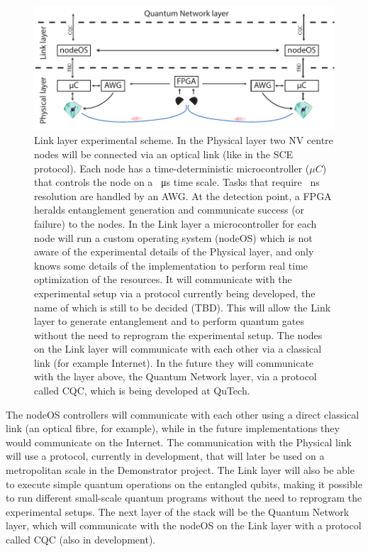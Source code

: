 \documentclass[a4paper]{article}
\begin{document}
\begin{figure}
	\includegraphics[width=\textwidth]{images/figure4}
	\caption{Link layer experimental scheme. 
		In the Physical layer two \ac{NV} centre nodes will be connected via an optical link (like in the \ac{SCE} protocol). Each node has a time-deterministic microcontroller ($\mu C$) that controls the node on a \SI{}{\micro s} time scale. Tasks that require \SI{}{\nano s} resolution are handled by an \acf{AWG}. At the detection point, a \acf{FPGA} heralds entanglement generation and communicate success (or failure) to the nodes.
		In the Link layer a microcontroller for each node will run a custom operating system (nodeOS) which is not aware of the experimental details of the Physical layer, and only knows some details of the  implementation to perform real time optimization of the resources. It will communicate with the experimental setup via a protocol currently being developed, the name of which is still to be decided (TBD). This will allow the Link layer to generate entanglement and to perform quantum gates without the need to reprogram the experimental setup. The nodes on the Link layer will communicate with each other via a classical link (for example Internet). In the future they will communicate with the layer above, the Quantum Network layer, via a protocol called \acf{CQC}, which is being developed at QuTech.
	}
	\label{fig:link_layer_experiment}
\end{figure}

The nodeOS controllers will communicate with each other using a direct classical link (an optical fibre, for example), while in the future implementations they would communicate on the Internet. The communication with the Physical link will use a protocol, currently in development, that will later be used on a metropolitan scale in the Demonstrator project.
The Link layer will also be able to execute simple quantum operations on the entangled qubits, making it possible to run different small-scale quantum programs without the need to reprogram the experimental setups.
The next layer of the stack will be the Quantum Network layer, which will communicate with the nodeOS on the Link layer with a protocol called \acf{CQC} (also in development).
\end{document}
